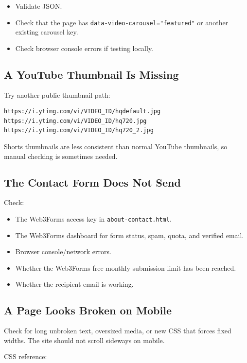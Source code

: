 \documentclass[11pt]{article}
\begin{document}
\begin{itemize}
  \item Validate JSON.
  \item Check that the page has \texttt{data-video-carousel="featured"} or another existing carousel key.
  \item Check browser console errors if testing locally.
\end{itemize}

\subsection{A YouTube Thumbnail Is Missing}

Try another public thumbnail path:

\begin{lstlisting}
https://i.ytimg.com/vi/VIDEO_ID/hqdefault.jpg
https://i.ytimg.com/vi/VIDEO_ID/hq720.jpg
https://i.ytimg.com/vi/VIDEO_ID/hq720_2.jpg
\end{lstlisting}

Shorts thumbnails are less consistent than normal YouTube thumbnails, so manual checking is sometimes needed.

\subsection{The Contact Form Does Not Send}

Check:

\begin{itemize}
  \item The Web3Forms access key in \texttt{about-contact.html}.
  \item The Web3Forms dashboard for form status, spam, quota, and verified email.
  \item Browser console/network errors.
  \item Whether the Web3Forms free monthly submission limit has been reached.
  \item Whether the recipient email is working.
\end{itemize}

\subsection{A Page Looks Broken on Mobile}

Check for long unbroken text, oversized media, or new CSS that forces fixed widths. The site should not scroll sideways on mobile.

CSS reference:
\end{document}
